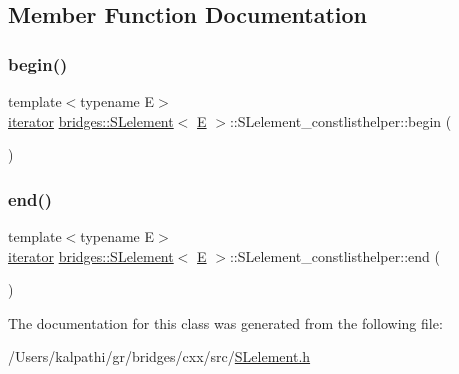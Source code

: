 \subsection{Member Function Documentation}
\mbox{\label{classbridges_1_1_s_lelement_1_1_s_lelement__constlisthelper_a8e249ed544f62a325b0e5b047519b70e}} 
\subsubsection{\texorpdfstring{begin()}{begin()}}
{\footnotesize\ttfamily template$<$typename E$>$ \\
\mbox{\hyperlink{classbridges_1_1_s_lelement_1_1_s_lelement__constlisthelper_1_1iterator}{iterator}} \mbox{\hyperlink{classbridges_1_1_s_lelement}{bridges\+::\+S\+Lelement}}$<$ \mbox{\hyperlink{namespacebridges_acfb0a4f7877d8f63de3e6862004c50eda3a3ea00cfc35332cedf6e5e9a32e94da}{E}} $>$\+::S\+Lelement\+\_\+constlisthelper\+::begin (\begin{DoxyParamCaption}{ }\end{DoxyParamCaption})\hspace{0.3cm}{\ttfamily [inline]}}

\mbox{\label{classbridges_1_1_s_lelement_1_1_s_lelement__constlisthelper_a55dafccf3d35b8746b2de761c2309cef}} 
\subsubsection{\texorpdfstring{end()}{end()}}
{\footnotesize\ttfamily template$<$typename E$>$ \\
\mbox{\hyperlink{classbridges_1_1_s_lelement_1_1_s_lelement__constlisthelper_1_1iterator}{iterator}} \mbox{\hyperlink{classbridges_1_1_s_lelement}{bridges\+::\+S\+Lelement}}$<$ \mbox{\hyperlink{namespacebridges_acfb0a4f7877d8f63de3e6862004c50eda3a3ea00cfc35332cedf6e5e9a32e94da}{E}} $>$\+::S\+Lelement\+\_\+constlisthelper\+::end (\begin{DoxyParamCaption}{ }\end{DoxyParamCaption})\hspace{0.3cm}{\ttfamily [inline]}}



The documentation for this class was generated from the following file\+:\begin{DoxyCompactItemize}
\item 
/\+Users/kalpathi/gr/bridges/cxx/src/\mbox{\hyperlink{_s_lelement_8h}{S\+Lelement.\+h}}\end{DoxyCompactItemize}
